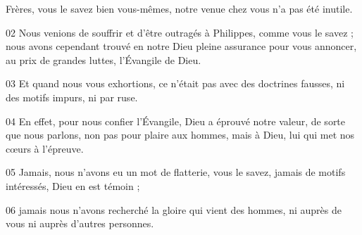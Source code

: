 Frères, vous le savez bien vous-mêmes, notre venue chez vous n’a pas été inutile.

02 Nous venions de souffrir et d’être outragés à Philippes, comme vous le savez ; nous avons cependant trouvé en notre Dieu pleine assurance pour vous annoncer, au prix de grandes luttes, l’Évangile de Dieu.

03 Et quand nous vous exhortions, ce n’était pas avec des doctrines fausses, ni des motifs impurs, ni par ruse.

04 En effet, pour nous confier l’Évangile, Dieu a éprouvé notre valeur, de sorte que nous parlons, non pas pour plaire aux hommes, mais à Dieu, lui qui met nos cœurs à l’épreuve.

05 Jamais, nous n’avons eu un mot de flatterie, vous le savez, jamais de motifs intéressés, Dieu en est témoin ;

06 jamais nous n’avons recherché la gloire qui vient des hommes, ni auprès de vous ni auprès d’autres personnes.